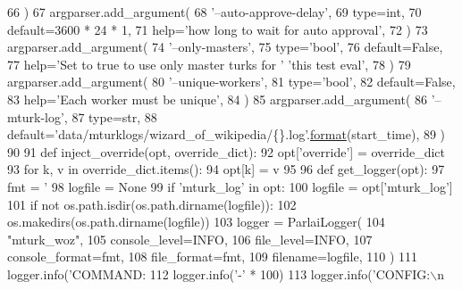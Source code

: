 \begin{DoxyCode}
{66     )
67     argparser.add\_argument(
68         \textcolor{stringliteral}{'--auto-approve-delay'},
69         type=int,
70         default=3600 * 24 * 1,
71         help=\textcolor{stringliteral}{'how long to wait for auto approval'},
72     )
73     argparser.add\_argument(
74         \textcolor{stringliteral}{'--only-masters'},
75         type=\textcolor{stringliteral}{'bool'},
76         default=\textcolor{keyword}{False},
77         help=\textcolor{stringliteral}{'Set to true to use only master turks for '} \textcolor{stringliteral}{'this test eval'},
78     )
79     argparser.add\_argument(
80         \textcolor{stringliteral}{'--unique-workers'},
81         type=\textcolor{stringliteral}{'bool'},
82         default=\textcolor{keyword}{False},
83         help=\textcolor{stringliteral}{'Each worker must be unique'},
84     )
85     argparser.add\_argument(
86         \textcolor{stringliteral}{'--mturk-log'},
87         type=str,
88         default=\textcolor{stringliteral}{'data/mturklogs/wizard\_of\_wikipedia/\{\}.log'}.\hyperlink{namespaceparlai_1_1chat__service_1_1services_1_1messenger_1_1shared__utils_a32e2e2022b824fbaf80c747160b52a76}{format}(start\_time),
89     )
90 
91     \textcolor{keyword}{def }inject\_override(opt, override\_dict):
92         opt[\textcolor{stringliteral}{'override'}] = override\_dict
93         \textcolor{keywordflow}{for} k, v \textcolor{keywordflow}{in} override\_dict.items():
94             opt[k] = v
95 
96     \textcolor{keyword}{def }get\_logger(opt):
97         fmt = \textcolor{stringliteral}{'%
98         logfile = \textcolor{keywordtype}{None}
99         \textcolor{keywordflow}{if} \textcolor{stringliteral}{'mturk\_log'} \textcolor{keywordflow}{in} opt:
100             logfile = opt[\textcolor{stringliteral}{'mturk\_log'}]
101             \textcolor{keywordflow}{if} \textcolor{keywordflow}{not} os.path.isdir(os.path.dirname(logfile)):
102                 os.makedirs(os.path.dirname(logfile))
103         logger = ParlaiLogger(
104             \textcolor{stringliteral}{"mturk\_woz"},
105             console\_level=INFO,
106             file\_level=INFO,
107             console\_format=fmt,
108             file\_format=fmt,
109             filename=logfile,
110         )
111         logger.info(\textcolor{stringliteral}{'COMMAND: %
112         logger.info(\textcolor{stringliteral}{'-'} * 100)
113         logger.info(\textcolor{stringliteral}{'CONFIG:\(\backslash\)n%
}}}}
\end{DoxyCode}
